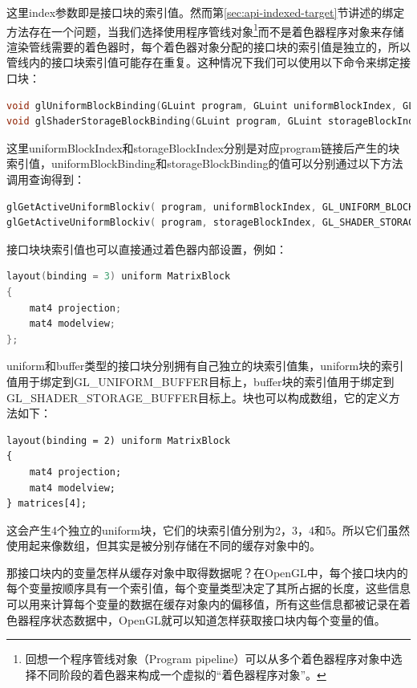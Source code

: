 这里index参数即是接口块的索引值。然而第\ref{sec:api-indexed-target}节讲述的绑定方法存在一个问题，当我们选择使用程序管线对象\footnote{回想一个程序管线对象（Program pipeline）可以从多个着色器程序对象中选择不同阶段的着色器来构成一个虚拟的“着色器程序对象”。}而不是着色器程序对象来存储渲染管线需要的着色器时，每个着色器对象分配的接口块的索引值是独立的，所以管线内的接口块索引值可能存在重复。这种情况下我们可以使用以下命令来绑定接口块：

\begin{lstlisting}[language=C++]
void glUniformBlockBinding​(GLuint program​​, GLuint uniformBlockIndex​​, GLuint uniformBlockBinding​​);
void glShaderStorageBlockBinding​(GLuint program​​, GLuint storageBlockIndex​​, GLuint storageBlockBinding​​);
\end{lstlisting}

这里uniformBlockIndex和storageBlockIndex分别是对应program链接后产生的块索引值，uniformBlockBinding和storageBlockBinding的值可以分别通过以下方法调用查询得到：

\begin{lstlisting}[language=C++]
glGetActiveUniformBlockiv( program, uniformBlockIndex, GL_UNIFORM_BLOCK_BINDING, &uniformBlockBinding );
glGetActiveUniformBlockiv( program, storageBlockIndex, GL_SHADER_STORAGE_BINDING, &storageBlockBinding );
\end{lstlisting}

接口块块索引值也可以直接通过着色器内部设置，例如：

\begin{lstlisting}[language=C++]
layout(binding = 3) uniform MatrixBlock
{
	mat4 projection;
	mat4 modelview;
};
\end{lstlisting}

uniform和buffer类型的接口块分别拥有自己独立的块索引值集，uniform块的索引值用于绑定到GL\_UNIFORM\_BUFFER目标上，buffer块的索引值用于绑定到GL\_SHADER\_STORAGE\_BUFFER目标上。块也可以构成数组，它的定义方法如下：

\begin{lstlisting}
layout(binding = 2) uniform MatrixBlock
{
	mat4 projection;
	mat4 modelview;
} matrices[4];
\end{lstlisting}

这会产生4个独立的uniform块，它们的块索引值分别为2，3，4和5。所以它们虽然使用起来像数组，但其实是被分别存储在不同的缓存对象中的。

那接口块内的变量怎样从缓存对象中取得数据呢？在OpenGL中，每个接口块内的每个变量按顺序具有一个索引值，每个变量类型决定了其所占据的长度，这些信息可以用来计算每个变量的数据在缓存对象内的偏移值，所有这些信息都被记录在着色器程序状态数据中，OpenGL就可以知道怎样获取接口块内每个变量的值。

